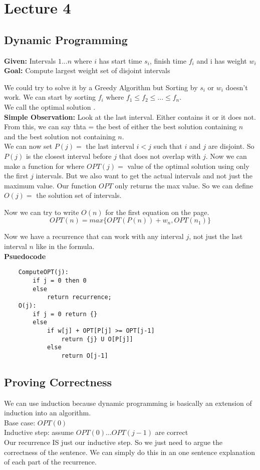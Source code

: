 \documentclass[oneside]{book}
\begin{document}
\chapter{Lecture 4}

\section{Dynamic Programming}

 {
   \textbf{Given:} Intervals $1...n$ where $i$ has start time $s_i$, finish time $f_i$ and i has weight $w_i$
   \textbf{Goal: } Compute largest weight set of disjoint intervals
}

We could try to solve it by a Greedy Algorithm but Sorting by $s_i$ or $w_i$ doesn't work.
We can start by sorting $f_i$ where $f_1 \leq f_2 \leq ... \leq f_n$.
\\
We call the optimal solution \opt.\\
\textbf{Simple Observation: } Look at the last interval. Either \opt contains it or it does not.\\
From this, we can say thta \opt = the best of either the best solution containing $n$ and the best solution not containing $n$.
\\
We can now set $P(j) =$ the last interval $i<j$ such that $i$ and $j$ are disjoint. So $P(j)$ is the closest interval before $j$ that does not overlap with $j$. Now we can make a function for \opt where $OPT(j) = $ value of the optimal solution using only the first $ j$ intervals.
But we also want to get the actual intervals and not just the maximum value. Our function $OPT$ only returns the max value. So we can define $O(j) = $ the solution set of intervals.

Now we can try to write $O(n)$ for the first equation on the page.
$$ OPT(n) = max\{OPT(P(n)) + w_n, OPT(n_1)\} $$

Now we have a recurrence that can work with any interval $j$, not just the last interval $n$ like in the formula.
\pagebreak
\\
\textbf{Psuedocode}
\begin{verbatim}
    ComputeOPT(j):
        if j = 0 then 0
        else 
            return recurrence;
    O(j):
        if j = 0 return {}
        else
            if w[j] + OPT[P[j] >= OPT[j-1]
                return {j} U O[P[j]]
            else
                return O[j-1]
\end{verbatim}
\section{Proving Correctness}
We can use induction because dynamic programming is basically an extension of induction into an algorithm.\\
Base case: $OPT(0)$ \\
Inductive step: assume $OPT(0)...OPT(j-1)$ are correct\\
Our recurrence IS just our inductive step. So we just need to argue the correctness of the sentence. We can simply do this in an one sentence explanation of each part of the recurrence.
\end{document}
